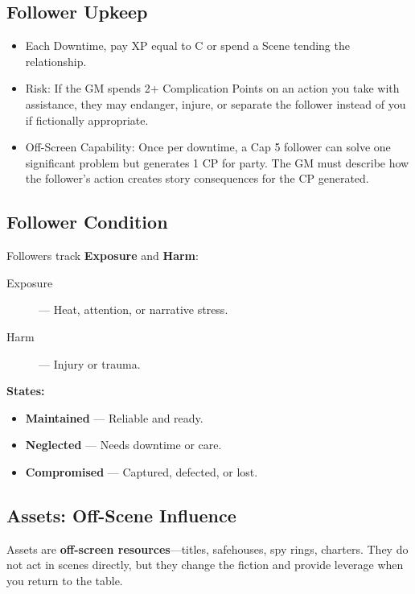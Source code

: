 \subsection*{Follower Upkeep}

\begin{itemize}
    \item Each Downtime, pay XP equal to C or spend a Scene tending the relationship.
    \item Risk: If the GM spends 2+ Complication Points on an action you take with assistance, they may endanger, injure, or separate the follower instead of you if fictionally appropriate.
    \item Off-Screen Capability: Once per downtime, a Cap 5 follower can solve one significant problem but generates 1 CP for party. The GM must describe how the follower's action creates story consequences for the CP generated.
\end{itemize}

\subsection*{Follower Condition}

Followers track \textbf{Exposure} and \textbf{Harm}:

\begin{description}
    \item[Exposure] --- Heat, attention, or narrative stress.
    \item[Harm] --- Injury or trauma.
\end{description}

\textbf{States:}
\begin{itemize}
    \item \textbf{Maintained} --- Reliable and ready.
    \item \textbf{Neglected} --- Needs downtime or care.
    \item \textbf{Compromised} --- Captured, defected, or lost.
\end{itemize}

\subsection*{Assets: Off-Scene Influence}

Assets are \textbf{off-screen resources}---titles, safehouses, spy rings, charters. They do not act in scenes directly, but they change the fiction and provide leverage when you return to the table.

